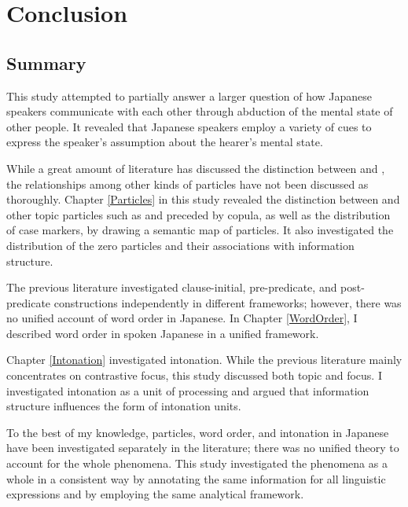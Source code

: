 \chapter{Conclusion}\label{Conclusion}


\section{Summary}

This study attempted to partially answer a larger question of
how Japanese speakers communicate with each other
through abduction of the mental state of other people.
It revealed that Japanese speakers employ a variety of cues to express the speaker's assumption about the hearer's mental state.

While a great amount of literature has discussed the distinction between  and ,
the relationships among other kinds of particles have not been discussed as thoroughly.
Chapter \ref{Particles} in this study revealed the distinction between  and other topic particles such as  and  preceded by copula,
as well as the distribution of case markers,
by drawing a semantic map of particles.
It also investigated the distribution of the zero particles and their associations with information structure.

The previous literature investigated clause-initial, pre-predicate, and post-predicate constructions %
independently in different frameworks;
however, there was no unified account of word order in Japanese.
In Chapter \ref{WordOrder},
I described word order in spoken Japanese in a unified framework.

Chapter \ref{Intonation} investigated intonation.
While the previous literature mainly concentrates on contrastive focus,
this study discussed both topic and focus.
I investigated intonation as a unit of processing and
argued that information structure influences the form of intonation units.

To the best of my knowledge,
particles, word order, and intonation in Japanese have been investigated separately in the literature;
there was no unified theory to account for the whole phenomena.
This study investigated the phenomena as a whole in a consistent way
by annotating the same information for all linguistic expressions and
by employing the same analytical framework.



